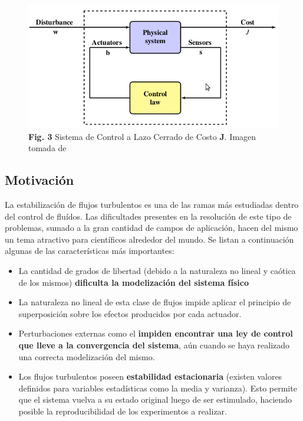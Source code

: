 \documentclass[a4paper,10pt]{article}
\begin{document}
        \begin{figure}[!Hhtb]
            \centering
            \includegraphics[width=12cm,origin=c]{Imagenes/control_loop.png}
            \caption{\textbf{Fig. 3} Sistema de Control a Lazo Cerrado de Costo \textbf{J}.
            Imagen tomada de \cite{Duriez2016}} \label{fig003}
        \end{figure}

        \subsection{Motivación} \label{sec:motiv}
        La estabilización de flujos turbulentos es una de las ramas más estudiadas dentro del control de fluídos. Las
        dificultades presentes en la resolución de este tipo de problemas, sumado a la gran cantidad de campos de aplicación, hacen del
        mismo un tema atractivo para científicos alrededor del mundo. Se listan a continuación algunas de las características más
        importantes:

        \begin{itemize}
            \item La cantidad de grados de libertad (debido a la naturaleza no lineal y caótica de los mismos) \textbf{dificulta la
            modelización del sistema físico}
            \item La naturaleza no lineal de esta clase de flujos impide aplicar el principio de superposición sobre los efectos producidos
            por cada actuador.
            \item Perturbaciones externas como el \textbf{impiden encontrar una ley de control que lleve a la
            convergencia del sistema}, aún cuando se haya realizado una correcta modelización del mismo.
            \item Los flujos turbulentos poseen \textbf{estabilidad estacionaria} (existen valores definidos para variables estadísticas
            como la media y varianza). Esto permite que el sistema vuelva a su estado original luego de ser estimulado, haciendo posible
            la reproducibilidad de los experimentos a realizar.
        \end{itemize}
\end{document}
